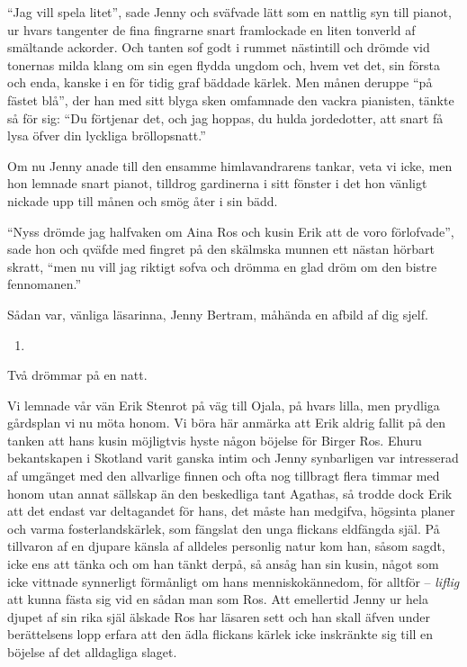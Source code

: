 ``Jag vill spela litet'', sade Jenny och sväfvade lätt som en nattlig
syn till pianot, ur hvars tangenter de fina fingrarne snart framlockade
en liten tonverld af smältande ackorder. Och tanten sof godt i rummet
nästintill och drömde vid tonernas milda klang om sin egen flydda ungdom
och, hvem vet det, sin första och enda, kanske i en för tidig graf
bäddade kärlek. Men månen deruppe ``på fästet blå'', der han med sitt
blyga sken omfamnade den vackra pianisten, tänkte så för sig: ``Du
förtjenar det, och jag hoppas, du hulda jordedotter, att snart få lysa
öfver din lyckliga bröllopsnatt.''

Om nu Jenny anade till den ensamme himlavandrarens tankar, veta vi icke,
men hon lemnade snart pianot, tilldrog gardinerna i sitt fönster i det
hon vänligt nickade upp till månen och smög åter i sin bädd.

``Nyss drömde jag halfvaken om Aina Ros och kusin Erik att de voro
förlofvade'', sade hon och qväfde med fingret på den skälmska munnen ett
nästan hörbart skratt, ``men nu vill jag riktigt sofva och drömma en
glad dröm om den bistre fennomanen.''

Sådan var, vänliga läsarinna, Jenny Bertram, måhända en afbild af dig
sjelf.

\begin{enumerate}
\def\labelenumi{\arabic{enumi}.}
\setcounter{enumi}{15}
\tightlist
\item
\end{enumerate}

Två drömmar på en natt.

Vi lemnade vår vän Erik Stenrot på väg till Ojala, på hvars lilla, men
prydliga gårdsplan vi nu möta honom. Vi böra här anmärka att Erik aldrig
fallit på den tanken att hans kusin möjligtvis hyste någon böjelse för
Birger Ros. Ehuru bekantskapen i Skotland varit ganska intim och Jenny
synbarligen var intresserad af umgänget med den allvarlige finnen och
ofta nog tillbragt flera timmar med honom utan annat sällskap än den
beskedliga tant Agathas, så trodde dock Erik att det endast var
deltagandet för hans, det måste han medgifva, högsinta planer och varma
fosterlandskärlek, som fängslat den unga flickans eldfängda själ. På
tillvaron af en djupare känsla af alldeles personlig natur kom han,
såsom sagdt, icke ens att tänka och om han tänkt derpå, så ansåg han sin
kusin, något som icke vittnade synnerligt förmånligt om hans
menniskokännedom, för alltför -- \emph{liflig} att kunna fästa sig vid
en sådan man som Ros. Att emellertid Jenny ur hela djupet af sin rika
själ älskade Ros har läsaren sett och han skall äfven under berättelsens
lopp erfara att den ädla flickans kärlek icke inskränkte sig till en
böjelse af det alldagliga slaget.

